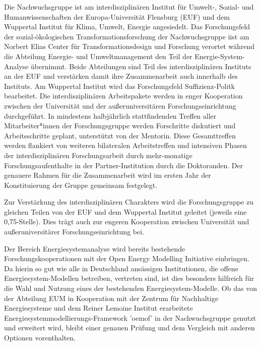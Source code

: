 \documentclass[a4paper,11pt,twoside]{scrartcl}
\begin{document}
Die Nachwuchsgruppe ist am interdisziplinären Institut für Umwelt-, Sozial- und Humanwissenschaften der Europa-Universität Flensburg (EUF) und dem Wuppertal Institut für Klima, Umwelt, Energie angesiedelt. Das Forschungsfeld der sozial-ökologischen Transformationsforschung der Nachwuchsgruppe iist am Norbert Elias Center für Transformationsdesign und Forschung verortet während die Abteilung Energie- und Umweltmanagement den Teil der Energie-System-Analyse übernimmt. Beide Abteilungen sind Teil des interdisziplinären Instituts an der EUF und verstärken damit ihre Zusammenarbeit auch innerhalb des Instituts. Am Wuppertal Institut wird das Forschungsfeld Suffizienz-Politk bearbeitet. Die interdisziplinären Arbeitspakete werden in enger Kooperation zwischen der Universität und der außeruniversitären Forschungseinrichtung durchgeführt. In mindestens halbjährlich stattfindenden Treffen aller Mitarbeiter*innen der Forschungsgruppe werden Forschritte diskutiert und Arbeitsschritte geplant, unterstützt von der Mentorin. Diese Gesamttreffen werden flankiert von weiteren bilateralen Arbeitstreffen und intensiven Phasen der interdisziplinären Forschungsarbeit durch mehr-monatige Forschungsaufenthalte in der Partner-Institution durch die Doktoranden. Der genauere Rahmen für die Zusammenarbeit wird im ersten Jahr der Konstituierung der Gruppe gemeinsam festgelegt.

Zur Verstärkung des interdisziplinären Charakters wird die Forschungsgruppe zu gleichen Teilen von der EUF und dem Wuppertal Institut geleitet (jeweils eine 0,75-Stelle). Dies trägt auch zur engeren Kooperation zwischen Universität und außeruniversitärer Forschungseinrichtung bei.

Der Bereich Energiesystemanalyse wird bereits bestehende Forschungskooperationen mit der Open Energy Modelling Initiative \cite{}
einbringen. Da hierin so gut wie alle in Deutschland ansässigen Institutionen, die offene Energiesystem-Modellen betreiben, vertreten sind, ist dies besonders hilfreich für die Wahl und Nutzung eines der bestehenden Energiesystem-Modelle. Ob das von der Abteilung EUM in Kooperation mit der Zentrum für Nachhaltige Energiesysteme und dem Reiner Lemoine Institut erarbeitete Energiesystemmodellierungs-Framework 'oemof' in der Nachwuchsgruppe genutzt und erweitert wird, bleibt einer genauen Prüfung und dem Vergleich mit anderen Optionen vorenthalten. 

\end{document}
